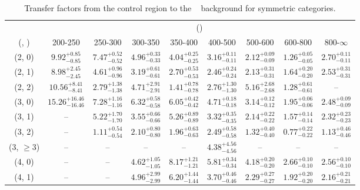 \begin{table}[h!]
\tiny
\centering
\caption{Transfer factors from the \mmj control region to the \zInv~ background for symmetric categories.\label{tab:tf_mumu_zinv_sym}}
\begin{tabular}
{ccccccccc}
	\hline\hline
	& \multicolumn{8}{c}{\scalht (\gev)} \\ 
	 (\njet,  \nb) & 200-250 & 250-300 & 300-350 & 350-400 & 400-500 & 500-600 & 600-800 & 800-$\infty$ \\ [0.8ex] 
\hline
	(2, 0) & $9.92^{+ 0.85 }_{- 0.85 }$ & $7.47^{+ 0.52 }_{- 0.52 }$ & $4.96^{+ 0.33 }_{- 0.33 }$ & $4.04^{+ 0.25 }_{- 0.25 }$ & $3.16^{+ 0.11 }_{- 0.11 }$ & $2.12^{+ 0.09 }_{- 0.09 }$ & $1.26^{+ 0.05 }_{- 0.05 }$ & $2.70^{+ 0.11 }_{- 0.11 }$ \\[0.5ex] 
	(2, 1) & $8.98^{+ 2.45 }_{- 2.45 }$ & $4.61^{+ 0.96 }_{- 0.96 }$ & $3.19^{+ 0.61 }_{- 0.61 }$ & $2.70^{+ 0.53 }_{- 0.53 }$ & $2.46^{+ 0.24 }_{- 0.24 }$ & $2.13^{+ 0.31 }_{- 0.31 }$ & $1.64^{+ 0.20 }_{- 0.20 }$ & $2.53^{+ 0.31 }_{- 0.31 }$ \\[0.5ex] 
	(2, 2) & $10.56^{+ 8.41 }_{- 8.41 }$ & $2.79^{+ 1.38 }_{- 1.38 }$ & $4.71^{+ 2.91 }_{- 2.91 }$ & $1.41^{+ 0.78 }_{- 0.78 }$ & $2.76^{+ 1.30 }_{- 1.30 }$ & $5.16^{+ 2.68 }_{- 2.68 }$ & $1.28^{+ 0.61 }_{- 0.61 }$ & -- \\[0.5ex] 
	(3, 0) & $15.26^{+ 16.46 }_{- 16.46 }$ & $7.28^{+ 1.16 }_{- 1.16 }$ & $6.32^{+ 0.58 }_{- 0.58 }$ & $6.05^{+ 0.42 }_{- 0.42 }$ & $4.71^{+ 0.18 }_{- 0.18 }$ & $3.14^{+ 0.12 }_{- 0.12 }$ & $1.95^{+ 0.06 }_{- 0.06 }$ & $2.48^{+ 0.09 }_{- 0.09 }$ \\[0.5ex] 
	(3, 1) & -- & $5.22^{+ 1.70 }_{- 1.70 }$ & $3.55^{+ 0.66 }_{- 0.66 }$ & $5.26^{+ 0.89 }_{- 0.89 }$ & $3.32^{+ 0.35 }_{- 0.35 }$ & $2.14^{+ 0.22 }_{- 0.22 }$ & $1.57^{+ 0.14 }_{- 0.14 }$ & $2.32^{+ 0.23 }_{- 0.23 }$ \\[0.5ex] 
	(3, 2) & -- & $1.11^{+ 0.54 }_{- 0.54 }$ & $2.10^{+ 0.80 }_{- 0.80 }$ & $1.96^{+ 0.63 }_{- 0.63 }$ & $2.49^{+ 0.58 }_{- 0.58 }$ & $1.32^{+ 0.40 }_{- 0.40 }$ & $0.77^{+ 0.22 }_{- 0.22 }$ & $1.13^{+ 0.46 }_{- 0.46 }$ \\[0.5ex] 
	(3, $\ge3$) & -- & -- & -- & -- & $4.38^{+ 4.56 }_{- 4.56 }$ & -- & -- & -- \\[0.5ex] 
	(4, 0) & -- & -- & $4.62^{+ 1.05 }_{- 1.05 }$ & $8.17^{+ 1.21 }_{- 1.21 }$ & $5.81^{+ 0.34 }_{- 0.34 }$ & $4.18^{+ 0.20 }_{- 0.20 }$ & $2.66^{+ 0.10 }_{- 0.10 }$ & $2.56^{+ 0.10 }_{- 0.10 }$ \\[0.5ex] 
	(4, 1) & -- & -- & $4.96^{+ 2.99 }_{- 2.99 }$ & $6.20^{+ 1.44 }_{- 1.44 }$ & $3.70^{+ 0.46 }_{- 0.46 }$ & $2.29^{+ 0.27 }_{- 0.27 }$ & $1.92^{+ 0.20 }_{- 0.20 }$ & $2.16^{+ 0.21 }_{- 0.21 }$ \\[0.5ex] 

\end{tabular}
\end{table}
